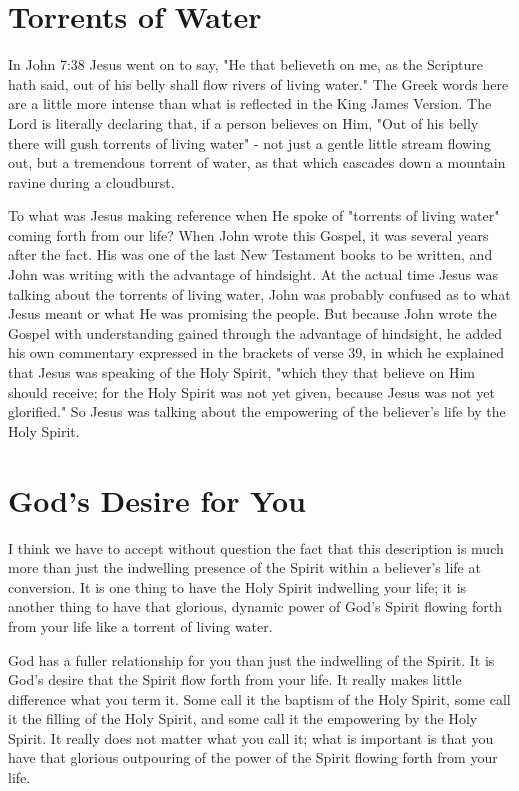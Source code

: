\section*{Torrents of Water}

In John 7:38 Jesus went on to say, "He that believeth on me, as the Scripture hath said, out of his belly shall flow rivers of living water." The Greek words here are a little more intense than what is reflected in the King James Version. The Lord is literally declaring that, if a person believes on Him, "Out of his belly there will gush torrents of living water" - not just a gentle little stream flowing out, but a tremendous torrent of water, as that which cascades down a mountain ravine during a cloudburst. 

To what was Jesus making reference when He spoke of "torrents of living water" coming forth from our life? When John wrote this Gospel, it was several years after the fact. His was one of the last New Testament books to be written, and John was writing with the advantage of hindsight. At the actual time Jesus was talking about the torrents of living water, John was probably confused as to what Jesus meant or what He was promising the people. But because John wrote the Gospel with understanding gained through the advantage of hindsight, he added his own commentary expressed in the brackets of verse 39, in which he explained that Jesus was speaking of the Holy Spirit, "which they that believe on Him should receive; for the Holy Spirit was not yet given, because Jesus was not yet glorified." So Jesus was talking about the empowering of the believer's life by the Holy Spirit. 

\section*{God's Desire for You}

I think we have to accept without question the fact that this description is much more than just the indwelling presence of the Spirit within a believer's life at conversion. It is one thing to have the Holy Spirit indwelling your life; it is another thing to have that glorious, dynamic power of God's Spirit flowing forth from your life like a torrent of living water. 

God has a fuller relationship for you than just the indwelling of the Spirit. It is God's desire that the Spirit flow forth from your life. It really makes little difference what you term it. Some call it the baptism of the Holy Spirit, some call it the filling of the Holy Spirit, and some call it the empowering by the Holy Spirit. It really does not matter what you call it; what is important is that you have that glorious outpouring of the power of the Spirit flowing forth from your life. 

